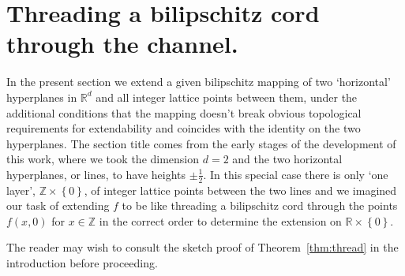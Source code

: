 \documentclass[a4paper, bibliography=totoc]{scrartcl}
\numberwithin{claimcounter}{define}
\newcommand{\R}{\mathbb{R}}
\newcommand{\Z}{\mathbb{Z}}
\newcommand{\set}[1]{\left\{#1\right\}}
\begin{document}
\section{Threading a bilipschitz cord through the channel.}\label{s:threading}
In the present section we extend a given bilipschitz mapping of two `horizontal' hyperplanes in $\R^{d}$ and all integer lattice points between them, under the additional conditions that the mapping doesn't break obvious topological requirements for extendability and coincides with the identity on the two hyperplanes. The section title comes from the early stages of the development of this work, where we took the dimension $d=2$ and the two horizontal hyperplanes, or lines, to have heights $\pm\frac{1}{2}$. In this special case there is only `one layer', $\Z\times\set{0}$, of integer lattice points between the two lines and we imagined our task of extending $f$ to be like threading a bilipschitz cord through the points $f(x,0)$ for $x\in\Z$ in the correct order to determine the extension on $\R\times\set{0}$.


\restatethread

The reader may wish to consult the sketch proof of Theorem~\ref{thm:thread} in the introduction before proceeding.
\end{document}

